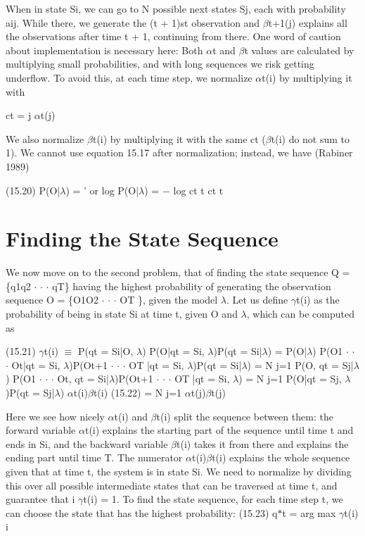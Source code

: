 When in state Si, we can go to N possible next states Sj, each with probability aij. While there, we generate the (t + 1)st observation and $\beta$t+1(j) explains all the observations after time t + 1, continuing from there. One word of caution about implementation is necessary here: Both $\alpha$t and $\beta$t values are calculated by multiplying small probabilities, and with long sequences we risk getting underflow. To avoid this, at each time step, we normalize $\alpha$t(i) by multiplying it with

ct = j $\alpha$t(j)

We also normalize $\beta$t(i) by multiplying it with the same ct ($\beta$t(i) do not sum to 1). We cannot use equation 15.17 after normalization; instead, we have (Rabiner 1989)

(15.20) P(O|$\lambda$) = ' or log P(O|$\lambda$) = $-$ log ct t ct t

\section{Finding the State Sequence}

We now move on to the second problem, that of finding the state sequence Q = \{q1q2 $\cdot$ $\cdot$ $\cdot$ qT\} having the highest probability of generating the observation sequence O = \{O1O2 $\cdot$ $\cdot$ $\cdot$ OT \}, given the model $\lambda$. Let us define $\gamma$t(i) as the probability of being in state Si at time t, given O and $\lambda$, which can be computed as

(15.21) $\gamma$t(i) $\equiv$ P(qt = Si|O, $\lambda$) P(O|qt = Si, $\lambda$)P(qt = Si|$\lambda$) = P(O|$\lambda$) P(O1 $\cdot$ $\cdot$ $\cdot$ Ot|qt = Si, $\lambda$)P(Ot+1 $\cdot$ $\cdot$ $\cdot$ OT |qt = Si, $\lambda$)P(qt = Si|$\lambda$) = N j=1 P(O, qt = Sj|$\lambda$) P(O1 $\cdot$ $\cdot$ $\cdot$ Ot, qt = Si|$\lambda$)P(Ot+1 $\cdot$ $\cdot$ $\cdot$ OT |qt = Si, $\lambda$) = N j=1 P(O|qt = Sj, $\lambda$)P(qt = Sj|$\lambda$) $\alpha$t(i)$\beta$t(i) (15.22) = N j=1 $\alpha$t(j)$\beta$t(j)

Here we see how nicely $\alpha$t(i) and $\beta$t(i) split the sequence between them: the forward variable $\alpha$t(i) explains the starting part of the sequence until time t and ends in Si, and the backward variable $\beta$t(i) takes it from there and explains the ending part until time T. The numerator $\alpha$t(i)$\beta$t(i) explains the whole sequence given that at time t, the system is in state Si. We need to normalize by dividing this over all possible intermediate states that can be traversed at time t, and guarantee that i $\gamma$t(i) = 1. To find the state sequence, for each time step t, we can choose the state that has the highest probability: (15.23) q$*$t = arg max $\gamma$t(i) i

